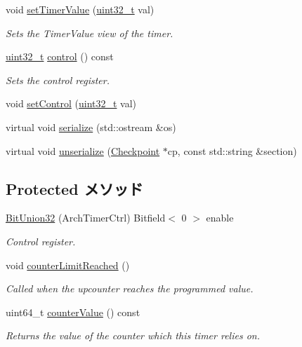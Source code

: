\begin{DoxyCompactItemize}
void \hyperlink{classGenericTimer_1_1ArchTimer_ac19d12d53a8aa1e9296dde6d4755c854}{setTimerValue} (\hyperlink{Type_8hh_a435d1572bf3f880d55459d9805097f62}{uint32\_\-t} val)
\begin{DoxyCompactList}\small\item\em Sets the TimerValue view of the timer. \item\end{DoxyCompactList}\item 
\hyperlink{Type_8hh_a435d1572bf3f880d55459d9805097f62}{uint32\_\-t} \hyperlink{classGenericTimer_1_1ArchTimer_a75c980484dfd57725a2378d0958f046c}{control} () const 
\begin{DoxyCompactList}\small\item\em Sets the control register. \item\end{DoxyCompactList}\item 
void \hyperlink{classGenericTimer_1_1ArchTimer_ab57ae80f8d45e22d44bd70e5e4655c1c}{setControl} (\hyperlink{Type_8hh_a435d1572bf3f880d55459d9805097f62}{uint32\_\-t} val)
\item 
virtual void \hyperlink{classGenericTimer_1_1ArchTimer_a53e036786d17361be4c7320d39c99b84}{serialize} (std::ostream \&os)
\item 
virtual void \hyperlink{classGenericTimer_1_1ArchTimer_af22e5d6d660b97db37003ac61ac4ee49}{unserialize} (\hyperlink{classCheckpoint}{Checkpoint} $\ast$cp, const std::string \&section)
\end{DoxyCompactItemize}
\subsection*{Protected メソッド}
\begin{DoxyCompactItemize}
\item 
\hyperlink{classGenericTimer_1_1ArchTimer_a34ca41431610ed97a96ebaee72938bf4}{BitUnion32} (ArchTimerCtrl) Bitfield$<$ 0 $>$ enable
\begin{DoxyCompactList}\small\item\em Control register. \item\end{DoxyCompactList}\item 
void \hyperlink{classGenericTimer_1_1ArchTimer_acc4e0298c1061147051688ef6dd627de}{counterLimitReached} ()
\begin{DoxyCompactList}\small\item\em Called when the upcounter reaches the programmed value. \item\end{DoxyCompactList}\item 
uint64\_\-t \hyperlink{classGenericTimer_1_1ArchTimer_afeb6e6524af1f7d73d5233438369a5ae}{counterValue} () const 
\begin{DoxyCompactList}\small\item\em Returns the value of the counter which this timer relies on. \item\end{DoxyCompactList}\end{DoxyCompactItemize}

